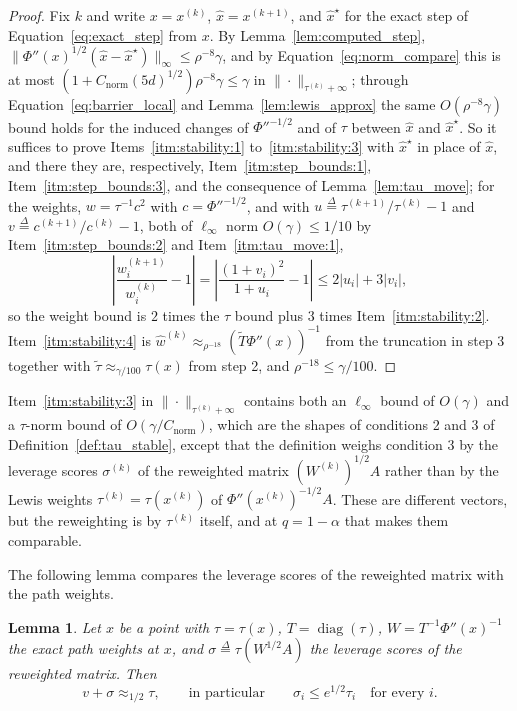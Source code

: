 \documentclass[11pt]{article}
\newtheorem{lemma}{Lemma}[section]
\newcommand{\diag}{\operatorname{diag}}
\newcommand{\what}{\widehat{w}}
\newcommand{\xhat}{\widehat{x}}
\newcommand{\tautil}{\widetilde{\tau}}
\newcommand{\defeq}{\stackrel{\Delta}{=}}
\newcommand{\Cnorm}{C_{\mathrm{norm}}}
\begin{document}
\begin{proof}
Fix $k$ and write
$x = x^{(k)}$,
$\xhat = x^{(k + 1)}$, and
$\xhat^{\star}$ for the exact step of Equation~\eqref{eq:exact_step} from
$x$.
By Lemma~\ref{lem:computed_step},
$\|\Phi''(x)^{1/2} (\xhat - \xhat^{\star})\|_{\infty} \le \rho^{-8} \gamma$, and
by Equation~\eqref{eq:norm_compare} this is at most
$(1 + \Cnorm (5 d)^{1/2}) \rho^{-8} \gamma \le \gamma$ in
$\|\cdot\|_{\tau^{(k)} + \infty}$; through Equation~\eqref{eq:barrier_local} and
Lemma~\ref{lem:lewis_approx} the same $O(\rho^{-8} \gamma)$ bound holds for the
induced changes of $\Phi''^{-1/2}$ and of
$\tau$ between
$\xhat$ and
$\xhat^{\star}$.
So it suffices to prove Items~\ref{itm:stability:1} to~\ref{itm:stability:3}
with $\xhat^{\star}$ in place of
$\xhat$, and there they are, respectively, Item~\ref{itm:step_bounds:1},
Item~\ref{itm:step_bounds:3}, and the consequence of Lemma~\ref{lem:tau_move};
for the weights, $w = \tau^{-1} c^{2}$ with
$c = \Phi''^{-1/2}$, and with
$u \defeq \tau^{(k+1)} / \tau^{(k)} - 1$ and
$v \defeq c^{(k+1)} / c^{(k)} - 1$, both of
$\ell_\infty$ norm
$O(\gamma) \le 1/10$ by Item~\ref{itm:step_bounds:2} and
Item~\ref{itm:tau_move:1},
\[
\left| \frac{w^{(k + 1)}_i}{w^{(k)}_i} - 1 \right|
=
\left| \frac{(1 + v_i)^{2}}{1 + u_i} - 1 \right|
\le
2 |u_i| + 3 |v_i|,
\]
so the weight bound is $2$ times the
$\tau$ bound plus
$3$ times Item~\ref{itm:stability:2}.
Item~\ref{itm:stability:4} is
$\what^{(k)} \approx_{\rho^{-18}} (\widetilde T \Phi''(x))^{-1}$ from the
truncation in step 3 together with $\tautil \approx_{\gamma / 100} \tau(x)$ from
step 2, and $\rho^{-18} \le \gamma / 100$.
\end{proof}

Item~\ref{itm:stability:3} in $\|\cdot\|_{\tau^{(k)} + \infty}$ contains both an
$\ell_\infty$ bound of
$O(\gamma)$ and a
$\tau$-norm bound of
$O(\gamma / \Cnorm)$, which are the shapes of conditions 2 and 3 of
Definition~\ref{def:tau_stable}, except that the definition weighs condition 3
by the leverage scores $\sigma^{(k)}$ of the reweighted matrix
$(W^{(k)})^{1/2} A$ rather than by the Lewis weights
$\tau^{(k)} = \tau(x^{(k)})$ of
$\Phi''(x^{(k)})^{-1/2} A$.
These are different vectors, but the reweighting is by $\tau^{(k)}$ itself, and
at $q = 1 - \alpha$ that makes them comparable.

The following lemma compares the leverage scores of the reweighted matrix with
the path weights.

\begin{lemma}
\label{lem:sigma_vs_tau}
Let $x$ be a point with
$\tau = \tau(x)$,
$T = \diag(\tau)$,
$W = T^{-1} \Phi''(x)^{-1}$ the exact path weights at
$x$, and
$\sigma \defeq \tau(W^{1/2} A)$ the leverage scores of the reweighted matrix.
Then
\[
v + \sigma \approx_{1/2} \tau,
\qquad\text{in particular}\qquad
\sigma_i \le e^{1/2} \tau_i
\quad\text{for every } i .
\]
\end{lemma}
\end{document}
